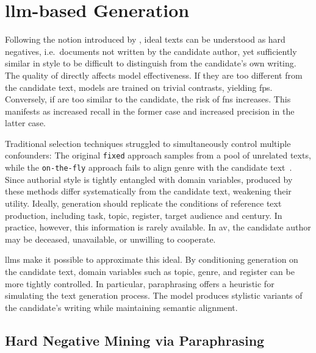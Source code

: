 \section{\acs{llm}-based \Imp{} Generation}
\label{sec:impostor_generation}

Following the notion introduced by \citet{koppel_determining_2014}, ideal \imp{} texts can be understood as hard negatives, i.e.\ documents not written by the candidate author, yet sufficiently similar in style to be difficult to distinguish from the candidate's own writing. 
The quality of \imps{} directly affects model effectiveness.
If they are too different from the candidate text, models are trained on trivial contrasts, yielding \acp{fp}. 
Conversely, if \imps{} are too similar to the candidate, the risk of \acp{fn} increases.
This manifests as increased recall in the former case and increased precision in the latter case.

Traditional \imp{} selection techniques struggled to simultaneously control multiple confounders:
The original \texttt{fixed} approach samples from a pool of unrelated texts, while the \texttt{on-the-fly} approach fails to align genre with the candidate text~\citep{koppel_determining_2014}. 
Since authorial style is tightly entangled with domain variables, \imps{} produced by these methods differ systematically from the candidate text, weakening their utility. 
Ideally, \imp{} generation should replicate the conditions of reference text production, including task, topic, register, target audience and century. 
In practice, however, this information is rarely available.
In \ac{av}, the candidate author may be deceased, unavailable, or unwilling to cooperate.

\acp{llm} make it possible to approximate this ideal. 
By conditioning generation on the candidate text, domain variables such as topic, genre, and register can be more tightly controlled. 
In particular, paraphrasing offers a heuristic for simulating the text generation process. 
The model produces stylistic variants of the candidate's writing while maintaining semantic alignment.


\subsection{Hard Negative Mining via Paraphrasing}

